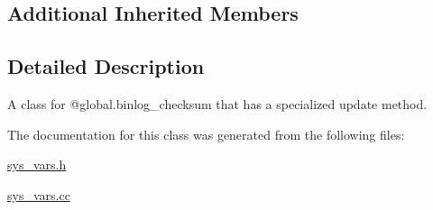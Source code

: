 \subsection*{Additional Inherited Members}


\subsection{Detailed Description}
A class for @global.\+binlog\+\_\+checksum that has a specialized update method. 

The documentation for this class was generated from the following files\+:\begin{DoxyCompactItemize}
\item 
\mbox{\hyperlink{sys__vars_8h}{sys\+\_\+vars.\+h}}\item 
\mbox{\hyperlink{sys__vars_8cc}{sys\+\_\+vars.\+cc}}\end{DoxyCompactItemize}
